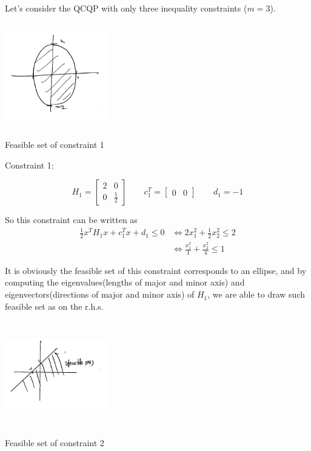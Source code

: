 \begin{example}
Let's consider the QCQP with only three inequality constraints ($m=3$).
\begin{marginfigure}
	\centering
	\includegraphics[width=1.8in,height=1.8in]{figures/ch07/figure1021_2.png}
	\caption{Feasible set of constraint 1} 
\end{marginfigure}

Constraint 1:

\begin{equation*}
H_1=\begin{bmatrix}
2 & 0 \\
0 &\frac{1}{2}
\end{bmatrix}
\qquad 
c_1^T = \begin{bmatrix}
0 & 0
\end{bmatrix}
\qquad 
d_1 = -1
\end{equation*}

So this constraint can be written as
\begin{align*}
\frac{1}{2}x^TH_1x + c_1^Tx + d_1 \leq 0 &\Leftrightarrow 2x_1^2 + \frac{1}{2}x_2^2 \leq 2\\
&\Leftrightarrow\frac{x_1^2}{1} + \frac{x_2^2}{4}\leq 1
\end{align*}

It is obviously the feasible set of this constraint corresponds to an ellipse, and by computing the eigenvalues(lengths of major and minor axis) and eigenvectors(directions of major and minor axis) of $H_1$, we are able to draw such feasible set as on the r.h.s.

\begin{marginfigure}
	\centering
	\includegraphics[width=1.8in,height=1.8in]{figures/ch07/figure1021_3.png}
	\caption{Feasible set of constraint 2} 
\end{marginfigure}


\end{example}

